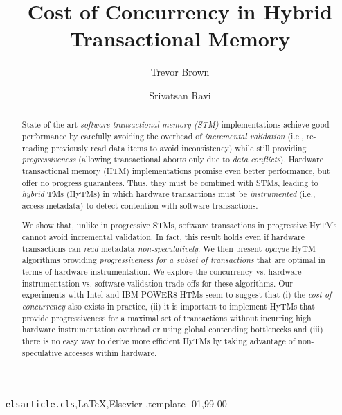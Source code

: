 \documentclass[review]{elsarticle}
\begin{document}
\begin{frontmatter}

\title{Cost of Concurrency in Hybrid Transactional Memory}

\author{Trevor Brown}
\address{University of Waterloo}

\author{Srivatsan Ravi}
\address{University of Southern California}


\begin{abstract}
State-of-the-art \emph{software transactional memory (STM)} implementations achieve 
good performance by carefully avoiding the overhead of \emph{incremental validation}
(i.e., re-reading previously read data items to avoid inconsistency) while
still providing \emph{progressiveness} (allowing transactional aborts only due to \emph{data conflicts}).
Hardware transactional memory (HTM) implementations promise even better performance, 
but offer no progress guarantees.
Thus, they must be combined with STMs, leading to \emph{hybrid} TMs (HyTMs)
in which hardware transactions must be \emph{instrumented} (i.e., access metadata) 
to detect contention with software transactions.

We show that, unlike in progressive STMs, software transactions in progressive HyTMs
cannot avoid incremental validation.
In fact, this result holds even if hardware transactions can \emph{read} metadata 
\emph{non-speculatively}. 
We then present \emph{opaque} HyTM algorithms providing \emph{progressiveness for a subset of transactions} 
that are  optimal in terms of hardware instrumentation. 
We explore the concurrency vs. hardware instrumentation vs. software validation
trade-offs for these algorithms.
Our experiments with Intel and IBM POWER8 HTMs   
seem to suggest that (i) the \emph{cost of concurrency} also exists in practice, 
(ii) it is important to implement HyTMs that provide progressiveness for a maximal set of transactions without incurring high hardware instrumentation overhead or
using global contending bottlenecks and (iii) 
there is no easy way to derive more efficient HyTMs by taking advantage of non-speculative accesses within hardware.

\end{abstract}

\begin{keyword}
\texttt{elsarticle.cls}\sep \LaTeX\sep Elsevier \sep template
-01\sep  99-00
\end{keyword}

\end{frontmatter}
\end{document}
